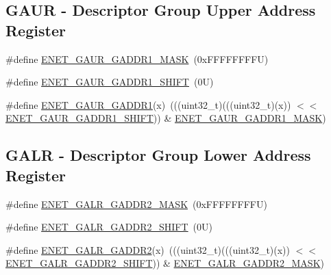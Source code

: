 \subsection*{G\+A\+UR -\/ Descriptor Group Upper Address Register}
\begin{DoxyCompactItemize}
\item 
\#define \mbox{\hyperlink{group___e_n_e_t___register___masks_ga6ae8043e613c7d0e8962e60b02b9bb04}{E\+N\+E\+T\+\_\+\+G\+A\+U\+R\+\_\+\+G\+A\+D\+D\+R1\+\_\+\+M\+A\+SK}}~(0x\+F\+F\+F\+F\+F\+F\+F\+F\+U)
\item 
\#define \mbox{\hyperlink{group___e_n_e_t___register___masks_ga38d4ad90575393e3e79e9436421a71b4}{E\+N\+E\+T\+\_\+\+G\+A\+U\+R\+\_\+\+G\+A\+D\+D\+R1\+\_\+\+S\+H\+I\+FT}}~(0\+U)
\item 
\#define \mbox{\hyperlink{group___e_n_e_t___register___masks_ga18686df13fea6ddef8e4e7583648df89}{E\+N\+E\+T\+\_\+\+G\+A\+U\+R\+\_\+\+G\+A\+D\+D\+R1}}(x)~(((uint32\+\_\+t)(((uint32\+\_\+t)(x)) $<$$<$ \mbox{\hyperlink{group___e_n_e_t___register___masks_ga38d4ad90575393e3e79e9436421a71b4}{E\+N\+E\+T\+\_\+\+G\+A\+U\+R\+\_\+\+G\+A\+D\+D\+R1\+\_\+\+S\+H\+I\+FT}})) \& \mbox{\hyperlink{group___e_n_e_t___register___masks_ga6ae8043e613c7d0e8962e60b02b9bb04}{E\+N\+E\+T\+\_\+\+G\+A\+U\+R\+\_\+\+G\+A\+D\+D\+R1\+\_\+\+M\+A\+SK}})
\end{DoxyCompactItemize}
\subsection*{G\+A\+LR -\/ Descriptor Group Lower Address Register}
\begin{DoxyCompactItemize}
\item 
\#define \mbox{\hyperlink{group___e_n_e_t___register___masks_ga8e26a6cd7140a83bfb1209d2359f3442}{E\+N\+E\+T\+\_\+\+G\+A\+L\+R\+\_\+\+G\+A\+D\+D\+R2\+\_\+\+M\+A\+SK}}~(0x\+F\+F\+F\+F\+F\+F\+F\+F\+U)
\item 
\#define \mbox{\hyperlink{group___e_n_e_t___register___masks_ga972b44abee90b40667709db22c6263a1}{E\+N\+E\+T\+\_\+\+G\+A\+L\+R\+\_\+\+G\+A\+D\+D\+R2\+\_\+\+S\+H\+I\+FT}}~(0\+U)
\item 
\#define \mbox{\hyperlink{group___e_n_e_t___register___masks_gac34b31c0ced54db9a6d54a2ba5151cad}{E\+N\+E\+T\+\_\+\+G\+A\+L\+R\+\_\+\+G\+A\+D\+D\+R2}}(x)~(((uint32\+\_\+t)(((uint32\+\_\+t)(x)) $<$$<$ \mbox{\hyperlink{group___e_n_e_t___register___masks_ga972b44abee90b40667709db22c6263a1}{E\+N\+E\+T\+\_\+\+G\+A\+L\+R\+\_\+\+G\+A\+D\+D\+R2\+\_\+\+S\+H\+I\+FT}})) \& \mbox{\hyperlink{group___e_n_e_t___register___masks_ga8e26a6cd7140a83bfb1209d2359f3442}{E\+N\+E\+T\+\_\+\+G\+A\+L\+R\+\_\+\+G\+A\+D\+D\+R2\+\_\+\+M\+A\+SK}})
\end{DoxyCompactItemize}

